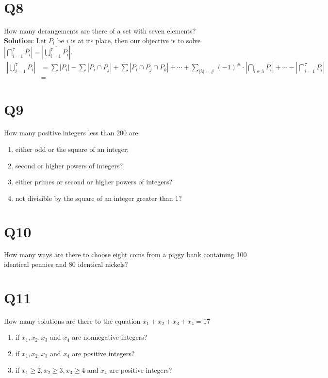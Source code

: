 \documentclass[11pt]{article}
\newenvironment{qparts}{\begin{enumerate}[{(}a{)}]}{\end{enumerate}}
\newenvironment{solution}{{\bf Solution}:}{\smallskip}
\begin{document}
\section*{Q8}
How many derangements are there of a set with seven elements?\\
\begin{solution}
    Let $P_{i }$ be $i$ is at its place, then our objective is to solve $\left\vert \bigcap_{i=1}^{7}\overline{P_{i}} \right\vert 
    =\left\vert \overline{\bigcup_{i=1}^{7}P_{i} } \right\vert $.
    \begin{align*}
        \left\vert \bigcup_{i=1}^{7}P_{i} \right\vert&=\sum\left\vert P_{i } \right\vert -\sum\left\vert P_{i}\cap P_{j} \right\vert +\sum \left\vert P_{i }\cap P_{j } \cap P_{k } \right\vert
        + \cdots +\sum_{\left\vert \lambda  \right\vert=\# }(-1)^{\#} \cdot \left\vert \bigcap_{i \in \lambda}P_{i } \right\vert + \cdots -
        \left\vert \bigcap_{i=1 }^{7}P_{i} \right\vert \\
        &=
    \end{align*}
\end{solution}

\section*{Q9}
How many positive integers less than 200 are
\begin{qparts}
    
    \item either odd or the square of an integer;
    \item second or higher powers of integers?
    \item  either primes or second or higher powers of integers?
    \item not divisible by the square of an integer greater than 1?
\end{qparts}

\section*{Q10}
How many ways are there to choose eight coins from a piggy bank containing 100 identical pennies and 80 identical nickels?

\section*{Q11}
How many solutions are there to the equation $x_1+x_2+x_3+x_4=17$
\begin{qparts}
    
    \item  if $x_1,x_2,x_3$ and $x_4$ are nonnegative integers?

    \item  if $x_1,x_2,x_3$ and $x_4$ are positive integers?

    \item  if $x_1\ge 2,x_2\ge 3,x_3\ge 4$ and $x_4$ are positive integers?
\end{qparts}
\end{document}
